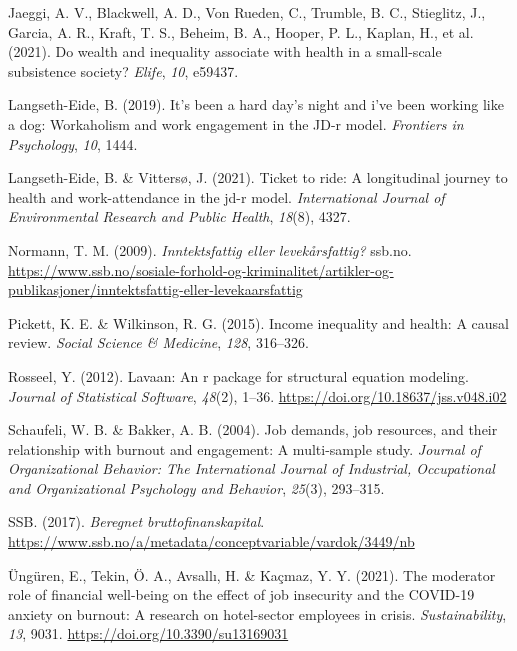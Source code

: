\documentclass[
  12pt,
  a4paper,
  DIV=11,
  numbers=noendperiod]{scrartcl}
\newlength{\cslhangindent}
\newenvironment{CSLReferences}[2] %
 {\begin{list}{}{%
  \setlength{\itemindent}{0pt}
  \setlength{\leftmargin}{0pt}
  \setlength{\parsep}{0pt}
  \ifodd #1
   \setlength{\leftmargin}{\cslhangindent}
   \setlength{\itemindent}{-1\cslhangindent}
  \fi
  \setlength{\itemsep}{#2\baselineskip}}}
 {\end{list}}
\begin{document}
\begin{CSLReferences}{1}{0}
Jaeggi, A. V., Blackwell, A. D., Von Rueden, C., Trumble, B. C.,
Stieglitz, J., Garcia, A. R., Kraft, T. S., Beheim, B. A., Hooper, P.
L., Kaplan, H., et al. (2021). Do wealth and inequality associate with
health in a small-scale subsistence society? \emph{Elife}, \emph{10},
e59437.

Langseth-Eide, B. (2019). It's been a hard day's night and i've been
working like a dog: Workaholism and work engagement in the JD-r model.
\emph{Frontiers in Psychology}, \emph{10}, 1444.

Langseth-Eide, B. \& Vittersø, J. (2021). Ticket to ride: A longitudinal
journey to health and work-attendance in the jd-r model.
\emph{International Journal of Environmental Research and Public
Health}, \emph{18}(8), 4327.

Normann, T. M. (2009). \emph{Inntektsfattig eller levekårsfattig?}
ssb.no.
\url{https://www.ssb.no/sosiale-forhold-og-kriminalitet/artikler-og-publikasjoner/inntektsfattig-eller-levekaarsfattig}

Pickett, K. E. \& Wilkinson, R. G. (2015). Income inequality and health:
A causal review. \emph{Social Science \& Medicine}, \emph{128},
316--326.

Rosseel, Y. (2012). Lavaan: An r package for structural equation
modeling. \emph{Journal of Statistical Software}, \emph{48}(2), 1--36.
\url{https://doi.org/10.18637/jss.v048.i02}

Schaufeli, W. B. \& Bakker, A. B. (2004). Job demands, job resources,
and their relationship with burnout and engagement: A multi-sample
study. \emph{Journal of Organizational Behavior: The International
Journal of Industrial, Occupational and Organizational Psychology and
Behavior}, \emph{25}(3), 293--315.

SSB. (2017). \emph{Beregnet bruttofinanskapital}.
\url{https://www.ssb.no/a/metadata/conceptvariable/vardok/3449/nb}

Üngüren, E., Tekin, Ö. A., Avsallı, H. \& Kaçmaz, Y. Y. (2021). The
moderator role of financial well-being on the effect of job insecurity
and the COVID-19 anxiety on burnout: A research on hotel-sector
employees in crisis. \emph{Sustainability}, \emph{13}, 9031.
\url{https://doi.org/10.3390/su13169031}


\end{CSLReferences}
\end{document}
